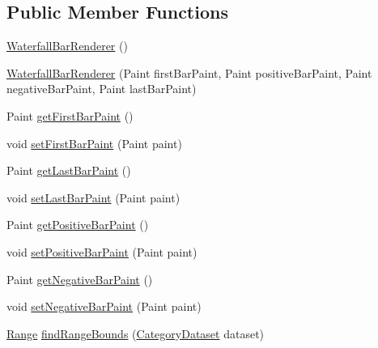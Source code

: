 \subsection*{Public Member Functions}
\begin{DoxyCompactItemize}
\item 
\mbox{\hyperlink{classorg_1_1jfree_1_1chart_1_1renderer_1_1category_1_1_waterfall_bar_renderer_a2df83dcb231b2d3fbaf3fc55f454ce06}{Waterfall\+Bar\+Renderer}} ()
\item 
\mbox{\hyperlink{classorg_1_1jfree_1_1chart_1_1renderer_1_1category_1_1_waterfall_bar_renderer_a0c77e39eaf677636afa44c4b6c1f258f}{Waterfall\+Bar\+Renderer}} (Paint first\+Bar\+Paint, Paint positive\+Bar\+Paint, Paint negative\+Bar\+Paint, Paint last\+Bar\+Paint)
\item 
Paint \mbox{\hyperlink{classorg_1_1jfree_1_1chart_1_1renderer_1_1category_1_1_waterfall_bar_renderer_a91f5fe45964c86835b743aeb62a2db35}{get\+First\+Bar\+Paint}} ()
\item 
void \mbox{\hyperlink{classorg_1_1jfree_1_1chart_1_1renderer_1_1category_1_1_waterfall_bar_renderer_a374861a88fd56a58cdd2515f7d31541a}{set\+First\+Bar\+Paint}} (Paint paint)
\item 
Paint \mbox{\hyperlink{classorg_1_1jfree_1_1chart_1_1renderer_1_1category_1_1_waterfall_bar_renderer_af270ab54e5385fa7f84c149d859b0164}{get\+Last\+Bar\+Paint}} ()
\item 
void \mbox{\hyperlink{classorg_1_1jfree_1_1chart_1_1renderer_1_1category_1_1_waterfall_bar_renderer_a84e30153b84f9118354f35552eeff0f3}{set\+Last\+Bar\+Paint}} (Paint paint)
\item 
Paint \mbox{\hyperlink{classorg_1_1jfree_1_1chart_1_1renderer_1_1category_1_1_waterfall_bar_renderer_a7ea83f86ebbfc9dc5dcb517339086b56}{get\+Positive\+Bar\+Paint}} ()
\item 
void \mbox{\hyperlink{classorg_1_1jfree_1_1chart_1_1renderer_1_1category_1_1_waterfall_bar_renderer_ae4e4121c71b397c72aa248be0c949c78}{set\+Positive\+Bar\+Paint}} (Paint paint)
\item 
Paint \mbox{\hyperlink{classorg_1_1jfree_1_1chart_1_1renderer_1_1category_1_1_waterfall_bar_renderer_a07653cf327d28be947bc0c585a7ee97d}{get\+Negative\+Bar\+Paint}} ()
\item 
void \mbox{\hyperlink{classorg_1_1jfree_1_1chart_1_1renderer_1_1category_1_1_waterfall_bar_renderer_a218eb64e52ef5e218c3459724defcd7d}{set\+Negative\+Bar\+Paint}} (Paint paint)
\item 
\mbox{\hyperlink{classorg_1_1jfree_1_1data_1_1_range}{Range}} \mbox{\hyperlink{classorg_1_1jfree_1_1chart_1_1renderer_1_1category_1_1_waterfall_bar_renderer_a851bbbf10211f21c9c6f105b5f511baf}{find\+Range\+Bounds}} (\mbox{\hyperlink{interfaceorg_1_1jfree_1_1data_1_1category_1_1_category_dataset}{Category\+Dataset}} dataset)

\end{DoxyCompactItemize}
